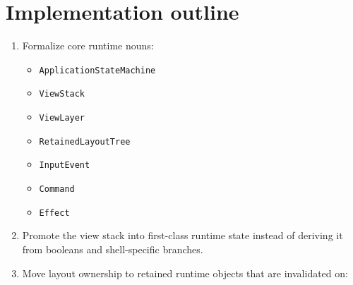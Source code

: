 \section{Implementation outline}\label{record-149-implementation-outline}

\begin{enumerate}
\def\labelenumi{\arabic{enumi}.}
\tightlist
\item
  Formalize core runtime nouns:

  \begin{itemize}
  \tightlist
  \item
    \texttt{A\allowbreak{}p\allowbreak{}p\allowbreak{}l\allowbreak{}i\allowbreak{}c\allowbreak{}a\allowbreak{}t\allowbreak{}i\allowbreak{}o\allowbreak{}n\allowbreak{}S\allowbreak{}t\allowbreak{}a\allowbreak{}t\allowbreak{}e\allowbreak{}M\allowbreak{}a\allowbreak{}c\allowbreak{}h\allowbreak{}i\allowbreak{}n\allowbreak{}e}
  \item
    \texttt{V\allowbreak{}i\allowbreak{}e\allowbreak{}w\allowbreak{}S\allowbreak{}t\allowbreak{}a\allowbreak{}c\allowbreak{}k}
  \item
    \texttt{V\allowbreak{}i\allowbreak{}e\allowbreak{}w\allowbreak{}L\allowbreak{}a\allowbreak{}y\allowbreak{}e\allowbreak{}r}
  \item
    \texttt{R\allowbreak{}e\allowbreak{}t\allowbreak{}a\allowbreak{}i\allowbreak{}n\allowbreak{}e\allowbreak{}d\allowbreak{}L\allowbreak{}a\allowbreak{}y\allowbreak{}o\allowbreak{}u\allowbreak{}t\allowbreak{}T\allowbreak{}r\allowbreak{}e\allowbreak{}e}
  \item
    \texttt{I\allowbreak{}n\allowbreak{}p\allowbreak{}u\allowbreak{}t\allowbreak{}E\allowbreak{}v\allowbreak{}e\allowbreak{}n\allowbreak{}t}
  \item
    \texttt{C\allowbreak{}o\allowbreak{}m\allowbreak{}m\allowbreak{}a\allowbreak{}n\allowbreak{}d}
  \item
    \texttt{E\allowbreak{}f\allowbreak{}f\allowbreak{}e\allowbreak{}c\allowbreak{}t}
  \end{itemize}
\item
  Promote the view stack into first-class runtime state instead of deriving it from booleans and shell-specific branches.
\item
  Move layout ownership to retained runtime objects that are invalidated on:


\end{enumerate}
